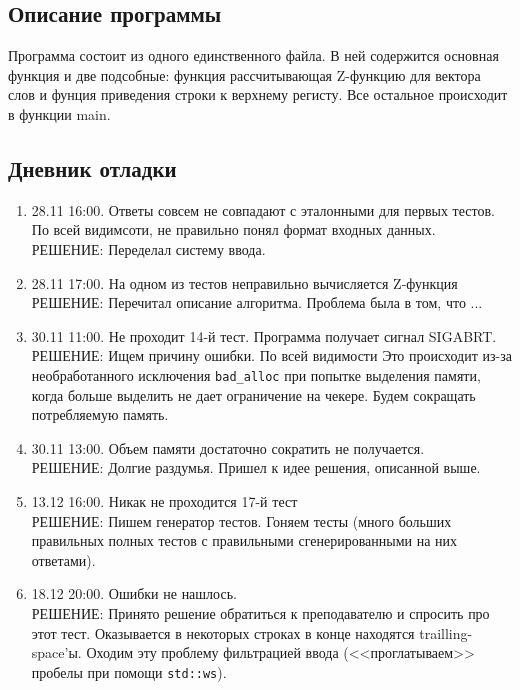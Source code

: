 \documentclass[12pt]{article}
\begin{document}
\subsection*{Описание программы}

Программа состоит из одного единственного файла. В ней содержится основная функция и две подсобные: функция рассчитывающая Z-функцию для вектора слов и фунция приведения строки к верхнему регисту. Все остальное происходит в функции main.

\subsection*{Дневник отладки}

\begin{enumerate}
    \item 28.11 16:00. Ответы совсем не совпадают с эталонными для первых тестов. По всей видимсоти, не правильно понял формат входных данных.\\
    РЕШЕНИЕ: Переделал систему ввода.
    \item 28.11 17:00. На одном из тестов неправильно вычисляется Z-функция\\
    РЕШЕНИЕ: Перечитал описание алгоритма. Проблема была в том, что ...
    \item 30.11 11:00. Не проходит 14-й тест. Программа получает сигнал SIGABRT.\\
    РЕШЕНИЕ: Ищем причину ошибки. По всей видимости Это происходит из-за необработанного исключения \verb|bad_alloc| при попытке выделения памяти, когда больше выделить не дает ограничение на чекере. Будем сокращать потребляемую память.
    \item 30.11 13:00. Объем памяти достаточно сократить не получается.\\
    РЕШЕНИЕ: Долгие раздумья. Пришел к идее решения, описанной выше.
    \item 13.12 16:00. Никак не проходится 17-й тест \\
    РЕШЕНИЕ: Пишем генератор тестов. Гоняем тесты (много больших правильных полных тестов с правильными сгенерированными на них ответами).
    \item 18.12 20:00. Ошибки не нашлось. \\
    РЕШЕНИЕ: Принято решение обратиться к преподавателю и спросить про этот тест. Оказывается в некоторых строках в конце находятся trailling-space'ы. Оходим эту проблему фильтрацией ввода (<<проглатываем>> пробелы при помощи \verb|std::ws|).
    
\end{enumerate}
\end{document}

